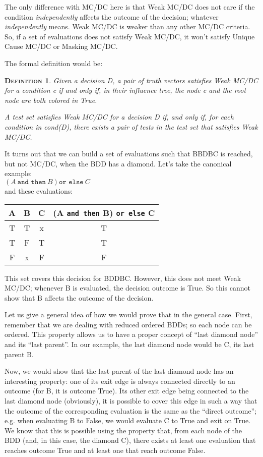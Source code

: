 \documentclass[a4paper,12pt,twoside]{article}
\newcommand{\andthen}{\texttt{and then}}
\newcommand{\orelse}{\texttt{or else}}
\newtheorem{definition}{\textsc{Definition}}
\begin{document}
The only difference with MC/DC here is that Weak MC/DC does not care
if the condition \textit{independently} affects the outcome of the decision;
whatever \textit{independently} means. Weak MC/DC is weaker than any other
MC/DC criteria. So, if a set of evaluations does not satisfy Weak MC/DC,
it won't satisfy Unique Cause MC/DC or Masking MC/DC.

The formal definition would be:

\begin{definition}
  \label{def:weak-mcdc}
  Given a decision D, a pair of truth vectors satisfies Weak MC/DC for
  a condition c if and only if, in their influence tree, the node c
  and the root node are both colored in True.

  A test set satisfies Weak MC/DC for a decision D if, and only if,
  for each condition in cond(D), there exists a pair of tests in the
  test set that satisfies Weak MC/DC.
\end{definition}

It turns out that we can build a set of evaluations such that BBDBC is
reached, but not MC/DC, when the BDD has a diamond.  Let's take the
canonical example:\\
$(A \ \andthen{} \ B) \orelse{} \ C$\\
and these evaluations:

\begin{center}
\begin{tabular}{|c|c|c||c|}
\hline
A & B & C & (A \andthen{} B) \orelse{} C \\ \hline
T & T & x & T \\ \hline
T & F & T & T \\ \hline
F & x & F & F \\ \hline
\end{tabular}
\end{center}

This set covers this decision for BDDBC. However, this does not meet
Weak MC/DC; whenever B is evaluated, the decision outcome is True. So
this cannot show that B affects the outcome of the decision.

Let us give a general idea of how we would prove that in the general
case. First, remember that we are dealing with reduced ordered BDDs;
so each node can be ordered. This property allows us to have a
proper concept of ``last diamond node'' and its ``last parent''. In our
example, the last diamond node would be C, its last parent B.

Now, we would show that the last parent of the last diamond node has
an interesting property: one of its exit edge is always connected
directly to an outcome (for B, it is outcome True). Its other exit
edge being connected to the last diamond node (obviously), it is
possible to cover this edge in such a way that the outcome of the
corresponding evaluation is the same as the ``direct outcome'';
e.g. when evaluating B to False, we would evaluate C to True and exit
on True. We know that this is possible using the property that, from
each node of the BDD (and, in this case, the diamond C), there exists
at least one evaluation that reaches outcome True and at least one that
reach outcome False.
\end{document}
